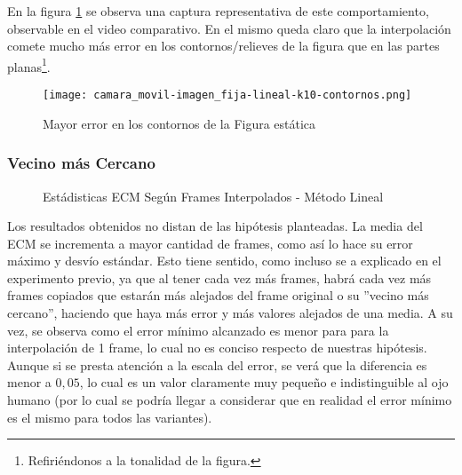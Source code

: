 \par En la figura \ref{fig:movil-fija_lineal-heatmap-contornos} se observa una
captura representativa de este comportamiento, observable en el video
comparativo. En el mismo queda claro que la interpolaci\'on comete mucho m\'as
error en los contornos/relieves de la figura que en las partes
planas\footnote{Refiri\'endonos a la tonalidad de la figura.}.

\begin{figure}[H]
    \centering
    \texttt{[image: camara\_movil-imagen\_fija-lineal-k10-contornos.png]}
    \label{fig:movil-fija_lineal-heatmap-contornos}
    \caption{Mayor error en los contornos de la Figura est\'atica}
\end{figure}

\subsubsection{Vecino m\'as Cercano}

\begin{figure}[H]
    \centering
    \caption{Est\'adisticas ECM Seg\'un Frames Interpolados - M\'etodo Lineal}
    \label{fig:movil-fija_vecino-mse_estadisticas}
\end{figure}

\par Los resultados obtenidos no distan de las hip\'otesis planteadas. La media
del ECM se incrementa a mayor cantidad de frames, como as\'i lo hace su error
m\'aximo y desv\'io est\'andar. Esto tiene sentido, como incluso se a explicado
en el experimento previo, ya que al tener cada vez m\'as frames, habr\'a cada
vez m\'as frames copiados que estar\'an m\'as alejados del frame original o su
''vecino m\'as cercano'', haciendo que haya m\'as error y m\'as valores alejados
de una media. A su vez, se observa como el error m\'inimo alcanzado es menor
para para la interpolaci\'on de 1 frame, lo cual no es conciso respecto de
nuestras hip\'otesis. Aunque si se presta atenci\'on a la escala del error, se
ver\'a que la diferencia es menor a $0,05$, lo cual es un valor claramente muy
peque\~no e indistinguible al ojo humano (por lo cual se podr\'ia llegar a
considerar que en realidad el error m\'inimo es el mismo para todos las
variantes).

